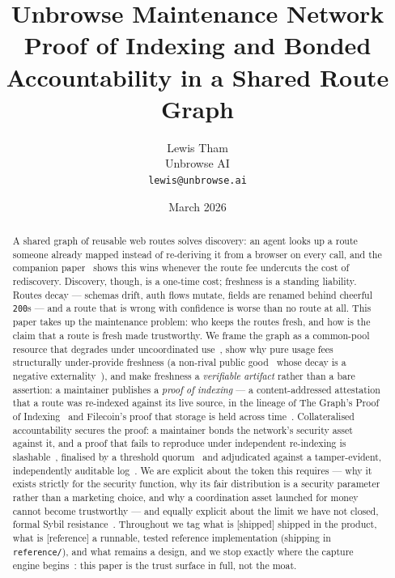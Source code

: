\documentclass[11pt]{article}
\title{\textbf{Unbrowse Maintenance Network}\\
\large Proof of Indexing and Bonded Accountability in a Shared Route Graph}
\author{Lewis Tham\\ Unbrowse AI \\ \texttt{lewis@unbrowse.ai}}
\date{March 2026}
\newcommand{\impl}{\textcolor{green!55!black}{\small[shipped]}}
\newcommand{\refimpl}{\textcolor{blue!70!black}{\small[reference]}}
\begin{document}
\maketitle

\begin{abstract}
A shared graph of reusable web routes solves discovery: an agent looks up a route
someone already mapped instead of re-deriving it from a browser on every call, and
the companion paper~\cite{internalapis} shows this wins whenever the route fee
undercuts the cost of rediscovery. Discovery, though, is a one-time cost; freshness
is a standing liability. Routes decay --- schemas drift, auth flows mutate, fields
are renamed behind cheerful \texttt{200}s --- and a route that is wrong with
confidence is worse than no route at all. This paper takes up the maintenance
problem: who keeps the routes fresh, and how is the claim that a route is fresh made
trustworthy. We frame the graph as a common-pool resource that degrades under
uncoordinated use~\cite{ostrom}, show why pure usage fees structurally under-provide
freshness (a non-rival public good~\cite{samuelson} whose decay is a negative
externality~\cite{pigou}), and make freshness a \emph{verifiable artifact} rather
than a bare assertion: a maintainer publishes a \emph{proof of indexing} --- a
content-addressed attestation that a route was re-indexed against its live source,
in the lineage of The Graph's Proof of Indexing~\cite{thegraph} and Filecoin's proof
that storage is held across time~\cite{filecoin2017}. Collateralised accountability
secures the proof: a maintainer bonds the network's security asset against it, and a
proof that fails to reproduce under independent re-indexing is slashable~\cite{casper},
finalised by a threshold quorum~\cite{frost} and adjudicated against a tamper-evident,
independently auditable log~\cite{rfc6962}. We are explicit about the token this
requires --- why it exists strictly for the security function, why its fair
distribution is a
security parameter rather than a marketing choice, and why a coordination asset
launched for money cannot become trustworthy --- and equally explicit about the
limit we have not closed, formal Sybil resistance~\cite{sybil}. Throughout we tag
what is \impl{} shipped in the product, what is \refimpl{} a runnable, tested
reference implementation (shipping in \texttt{reference/}), and what remains a
design, and we stop exactly where the capture engine begins~\cite{ossnotice}: this
paper is the trust surface in full, not the moat.
\end{abstract}
\end{document}

